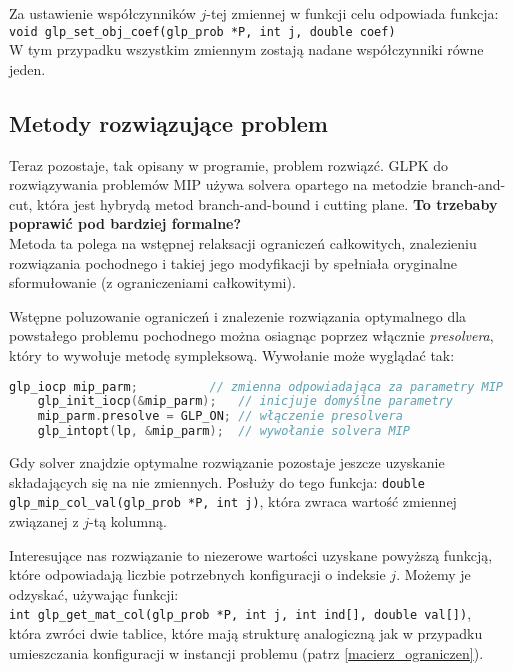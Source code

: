 Za ustawienie współczynników $j$-tej zmiennej w funkcji celu odpowiada funkcja: \\
\verb|void glp_set_obj_coef(glp_prob *P, int j, double coef)| \\
W tym przypadku wszystkim zmiennym zostają nadane współczynniki równe jeden.

\subsection{Metody rozwiązujące problem}
Teraz pozostaje, tak opisany w programie, problem rozwiązć. GLPK do rozwiązywania problemów MIP używa solvera opartego na metodzie branch-and-cut, która jest hybrydą metod branch-and-bound i cutting plane. 
\textbf{To trzebaby poprawić pod bardziej formalne?} \\
Metoda ta polega na wstępnej relaksacji ograniczeń całkowitych, znalezieniu rozwiązania pochodnego i takiej jego modyfikacji by spełniała oryginalne sformułowanie (z ograniczeniami całkowitymi).


Wstępne poluzowanie ograniczeń i znalezenie rozwiązania optymalnego dla powstałego problemu pochodnego można osiagnąc poprzez włącznie \textit{presolvera}, który to wywołuje metodę sympleksową.
Wywołanie może wyglądać tak:
\begin{lstlisting}[language=C]
	glp_iocp mip_parm;          // zmienna odpowiadająca za parametry MIP
	glp_init_iocp(&mip_parm);   // inicjuje domyślne parametry
	mip_parm.presolve = GLP_ON; // włączenie presolvera
	glp_intopt(lp, &mip_parm);  // wywołanie solvera MIP
\end{lstlisting}

Gdy solver znajdzie optymalne rozwiązanie pozostaje jeszcze uzyskanie składających się na nie zmiennych. Posłuży do tego funkcja:
\verb|double glp_mip_col_val(glp_prob *P, int j)|, która zwraca wartość zmiennej związanej z $j$-tą kolumną. 

Interesujące nas rozwiązanie to niezerowe wartości uzyskane powyższą funkcją, które odpowiadają liczbie potrzebnych konfiguracji o indeksie $j$. Możemy je odzyskać, używając funkcji: \\
\verb|int glp_get_mat_col(glp_prob *P, int j, int ind[], double val[])|, \\
która zwróci dwie tablice, które mają strukturę analogiczną jak w przypadku umieszczania konfiguracji w instancji problemu (patrz \ref{macierz_ograniczen}). 



